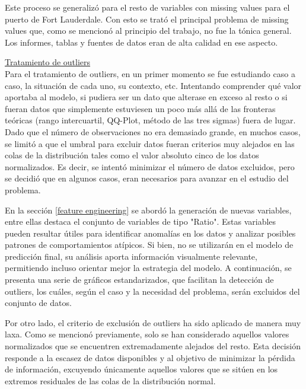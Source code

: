 \documentclass[12pt]{article}
\begin{document}
		Este proceso se generalizó para el resto de variables con missing values para el puerto de Fort Lauderdale. Con esto se trató el principal problema de missing values que, como se mencionó al principio del trabajo, no fue la tónica general. Los informes, tablas y fuentes de datos eran de alta calidad en ese aspecto.
		
		\underline{Tratamiento de outliers}\\
		Para el tratamiento de outliers, en un primer momento se fue estudiando caso a caso, la situación de cada uno, su contexto, etc. Intentando comprender qué valor aportaba al modelo, si pudiera ser un dato que alterase en exceso al resto o si fueran datos que simplemente estuviesen un poco más allá de las fronteras teóricas (rango intercuartil, QQ-Plot, método de las tres sigmas) fuera de lugar.
		Dado que el número de observaciones no era demasiado grande, en muchos casos, se limitó a que el umbral para excluir datos fueran criterios muy alejados en las colas de la distribución tales como el valor absoluto cinco de los datos normalizados. Es decir, se intentó minimizar el número de datos excluidos, pero se decidió que en algunos casos, eran necesarios para avanzar en el estudio del problema.
		
		En la sección \ref{feature engineering} se abordó la generación de nuevas variables, entre ellas destaca el conjunto de variables de tipo "Ratio". Estas variables pueden resultar útiles para identificar anomalías en los datos y analizar posibles patrones de comportamientos atípicos. Si bien, no se utilizarán en el modelo de predicción final, su análisis aporta información visualmente relevante, permitiendo incluso orientar mejor la estrategia del modelo. A continuación, se presenta una serie de gráficos estandarizados, que facilitan la detección de outliers, los cuáles, según el caso y la necesidad del problema, serán excluidos del conjunto de datos.
		
		
		Por otro lado, el criterio de exclusión de outliers ha sido aplicado de manera muy laxa. Como se mencionó previamente, solo se han considerado aquellos valores normalizados que se encuentren extremadamente alejados del resto. Esta decisión responde a la escasez de datos disponibles y al objetivo de minimizar la pérdida de información, excuyendo únicamente aquellos valores que se sitúen en los extremos residuales de las colas de la distribución normal.
		
\end{document}
